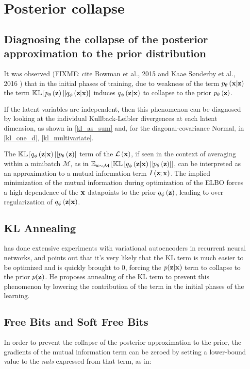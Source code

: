 \section{Posterior collapse}
\label{posterior_collapse}
\subsection{Diagnosing the collapse of the posterior approximation to the prior distribution}

It was observed\cite{Kingma2017}\cite{1611.02731} (FIXME: cite Bowman et al., 2015 and Kaae Sønderby et al., 2016 )
that in the initial phases of training, due to weakness of the term $p_\theta\left(\mathbf{x}|\mathbf{z}\right)$ the term $\mathbb{KL}\left[ p_\theta\left(\mathbf{z}\right) || q_\phi\left(\mathbf{z}|\mathbf{x}\right) \right]$ 
induces $q_\phi\left(\mathbf{z}|\mathbf{x}\right)$ to collapse to the prior $p_\theta\left(\mathbf{z}\right)$.

If the latent variables are independent, then this phenomenon can be diagnosed by looking at the individual Kullback-Leibler divergences
at each latent dimension, as shown in \ref{kl_as_sum} and, for the diagonal-covariance Normal, in \ref{kl_one_d}, \ref{kl_multivariate}.

 The $\mathbb{KL}\left[ q_\phi\left(\mathbf{z}|\mathbf{x}\right) || p_\theta\left(\mathbf{z}\right) \right]$ term of the $\mathcal{L}\left(\mathbf{x}\right)$, if seen in the context of averaging within a minibatch $\mathcal{M}$, as in
 $\mathbb{E}_{\mathbf{x}\sim\mathcal{M}}\left[ \mathbb{KL}\left[ q_\phi\left(\mathbf{z}|\mathbf{x}\right) || p_\theta\left(\mathbf{z}\right) \right] \right]$,
 can be interpreted as an approximation to a mutual information term $I\left( \mathbf{z} ; \mathbf{x} \right)$.
 The implied minimization of the mutual information during optimization of the ELBO forces a high dependence of the $\mathbf{x}$ datapoints to the prior $q_\phi\left(\mathbf{z}\right)$,
 leading to over-regularization of $q_\phi\left(\mathbf{z}|\mathbf{x}\right)$.

\subsection{KL Annealing}

\cite{Bowman} has done extensive experiments with variational autoencoders
in recurrent neural networks, and points out that it's very likely
that the KL term is much easier to be optimized
and is quickly brought to 0, forcing the $p(\mathbf{z}|\mathbf{x})$ term to
collapse to the prior $p(\mathbf{z})$.
He proposes annealing of the KL term to prevent this phenomenon by
lowering the contribution of the term in the initial phases of the learning.

\subsection{Free Bits and Soft Free Bits}
 In order to prevent the collapse of the posterior approximation to the prior, the gradients of the mutual information term can be zeroed by setting a lower-bound
 value to the \emph{nats} expressed from that term, as in:
\begin{nalign}
     \max\left[\lambda,\expectxM{\kl{\qzcond}{\pzonly}}\right]
\end{nalign}

